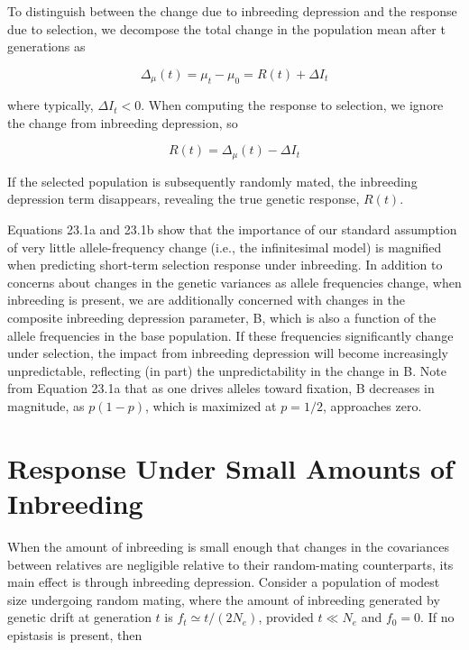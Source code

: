\documentclass{article}
\begin{document}
To distinguish between the change due to inbreeding depression and the response due to selection, we decompose the total change in the population mean after t generations as

\begin{equation}
\Delta_{\mu}(t)=\mu_{t}-\mu_{0}=R(t)+\Delta I_{t}
\tag{23.1c}
\label{eq:23_1c}
\end{equation}

where typically,  $ \Delta I_t < 0 $. When computing the response to selection, we ignore the change from inbreeding depression, so

\begin{equation}
R(t)=\Delta_{\mu}(t)-\Delta I_{t}
\tag{23.1d}
\label{eq:23_1d}
\end{equation}

If the selected population is subsequently randomly mated, the inbreeding depression term disappears, revealing the true genetic response,  $ R(t) $.

Equations 23.1a and 23.1b show that the importance of our standard assumption of very little allele-frequency change (i.e., the infinitesimal model) is magnified when predicting short-term selection response under inbreeding. In addition to concerns about changes in the genetic variances as allele frequencies change, when inbreeding is present, we are additionally concerned with changes in the composite inbreeding depression parameter, B, which is also a function of the allele frequencies in the base population. If these frequencies significantly change under selection, the impact from inbreeding depression will become increasingly unpredictable, reflecting (in part) the unpredictability in the change in B. Note from Equation 23.1a that as one drives alleles toward fixation, B decreases in magnitude, as  $ p(1 - p) $, which is maximized at  $ p = 1/2 $, approaches zero.

\section{Response Under Small Amounts of Inbreeding}
When the amount of inbreeding is small enough that changes in the covariances between relatives are negligible relative to their random-mating counterparts, its main effect is through inbreeding depression. Consider a population of modest size undergoing random mating, where the amount of inbreeding generated by genetic drift at generation  $ t $ is  $ f_t \simeq t/(2N_e) $, provided  $ t \ll N_e $ and  $ f_0 = 0 $. If no epistasis is present, then
\end{document}
